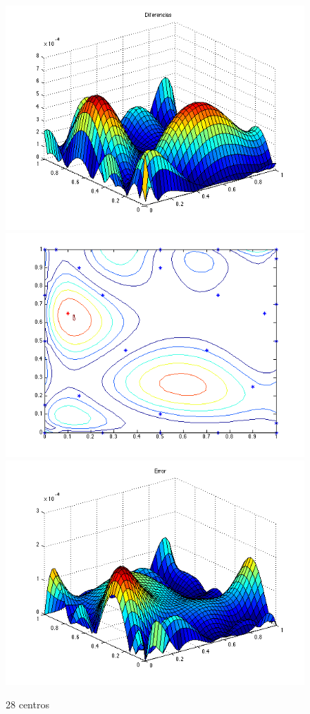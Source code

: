 \documentclass[11pt,a4paper]{article}
\begin{document}
\begin{figure}[H]
\centering

\includegraphics[scale=0.35]{diferencias28.png}
\includegraphics[scale=0.35]{centros28.png}
\includegraphics[scale=0.35]{error28.png}
\caption{28 centros}
\end{figure}
\end{document}
